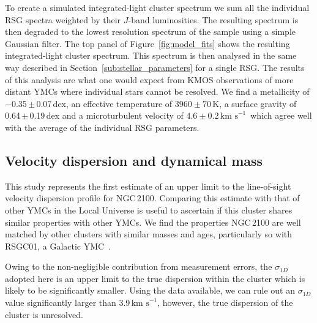 \documentclass[useAMS,usenatbib]{mn2e}
\def\kms{$\mbox{km s}^{-1}$}
\begin{document}

To create a simulated integrated-light cluster spectrum we sum all the individual RSG spectra weighted by their $J$-band luminosities.
The resulting spectrum is then degraded to the lowest resolution spectrum of the sample using a simple Gaussian filter.
The top panel of Figure~\ref{fig:model_fits} shows the resulting integrated-light cluster spectrum.
This spectrum is then analysed in the same way described in Section~\ref{sub:stellar_parameters} for a single RSG.
The results of this analysis are what one would expect from KMOS observations of more distant YMCs where individual stars cannot be resolved.
We find a metallicity of $-$0.35\,$\pm$\,0.07\,dex, an effective temperature of $3960\pm70\,$K,
a surface gravity of 0.64\,$\pm$\,0.19\,dex and a microturbulent velocity of $4.6\pm0.2\,$\kms~which agree well with the average of the individual RSG parameters.

\subsection{Velocity dispersion and dynamical mass} %
\label{sub:velocity_dispersion_Mdyn}

This study represents the first estimate of an upper limit to the line-of-sight velocity dispersion profile for NGC\,2100.
Comparing this estimate with that of other YMCs in the Local Universe is useful to ascertain if this cluster shares similar properties with other YMCs.
We find the properties NGC\,2100 are well matched by other clusters with similar masses and ages, particularly so with RSGC01, a Galactic YMC~\citep{2007ApJ...671..781D}.

Owing to the non-negligible contribution from measurement errors, the $\sigma_{1D}$ adopted here is an upper limit to the true dispersion within the cluster which is likely to be significantly smaller.
Using the data available, we can rule out an $\sigma_{1D}$ value significantly larger than 3.9\,\kms, however,
the true dispersion of the cluster is unresolved.
\end{document}

